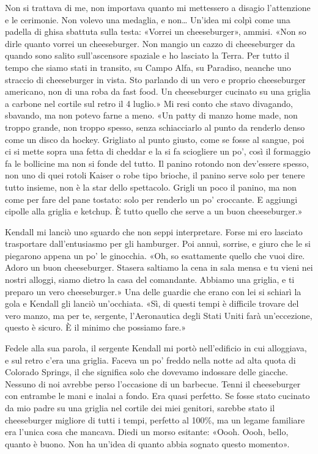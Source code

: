 Non si trattava di me, non importava quanto mi mettessero a disagio
l'attenzione e le cerimonie. Non volevo una medaglia, e non\ldots{}
Un'idea mi colpì come una padella di ghisa sbattuta sulla testa: «Vorrei
un cheeseburger», ammisi. «Non so dirle quanto vorrei un cheeseburger.
Non mangio un cazzo di cheeseburger da quando sono salito sull'ascensore
spaziale e ho lasciato la Terra. Per tutto il tempo che siamo stati in
transito, su Campo Alfa, su Paradiso, neanche uno straccio di
cheeseburger in vista. Sto parlando di un vero e proprio cheeseburger
americano, non di una roba da fast food. Un cheeseburger cucinato su una
griglia a carbone nel cortile sul retro il 4 luglio.» Mi resi conto che
stavo divagando, sbavando, ma non potevo farne a meno. «Un patty di
manzo home made, non troppo grande, non troppo spesso, senza
schiacciarlo al punto da renderlo denso come un disco da hockey.
Grigliato al punto giusto, come se fosse al sangue, poi ci si mette
sopra una fetta di cheddar e la si fa sciogliere un po', così il
formaggio fa le bollicine ma non si fonde del tutto. Il panino rotondo
non dev'essere spesso, non uno di quei rotoli Kaiser o robe tipo
brioche, il panino serve solo per tenere tutto insieme, non è la star
dello spettacolo. Grigli un poco il panino, ma non come per fare del
pane tostato: solo per renderlo un po' croccante. E aggiungi cipolle
alla griglia e ketchup. È tutto quello che serve a un buon
cheeseburger.»

Kendall mi lanciò uno sguardo che non seppi interpretare. Forse mi ero
lasciato trasportare dall'entusiasmo per gli hamburger. Poi annuì,
sorrise, e giuro che le si piegarono appena un po' le ginocchia. «Oh, so
esattamente quello che vuoi dire. Adoro un buon cheeseburger. Stasera
saltiamo la cena in sala mensa e tu vieni nei nostri alloggi, siamo
dietro la casa del comandante. Abbiamo una griglia, e ti preparo un vero
cheeseburger.» Una delle guardie che erano con lei si schiarì la gola e
Kendall gli lanciò un'occhiata. «Sì, di questi tempi è difficile trovare
del vero manzo, ma per te, sergente, l'Aeronautica degli Stati Uniti
farà un'eccezione, questo è sicuro. È il minimo che possiamo fare.»

\hfill\break

Fedele alla sua parola, il sergente Kendall mi portò nell'edificio in
cui alloggiava, e sul retro c'era una griglia. Faceva un po' freddo
nella notte ad alta quota di Colorado Springs, il che significa solo che
dovevamo indossare delle giacche. Nessuno di noi avrebbe perso
l'occasione di un barbecue. Tenni il cheeseburger con entrambe le mani e
inalai a fondo. Era quasi perfetto. Se fosse stato cucinato da mio padre
su una griglia nel cortile dei miei genitori, sarebbe stato il
cheeseburger migliore di tutti i tempi, perfetto al 100\%, ma un legame
familiare era l'unica cosa che mancava. Diedi un morso esitante: «Oooh.
Oooh, bello, quanto è buono. Non ha un'idea di quanto abbia sognato
questo momento».

